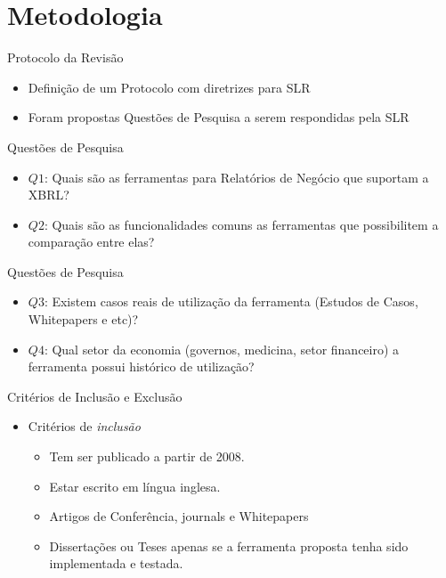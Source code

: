 \documentclass[t,14pt,mathserif]{beamer}
\begin{document}
\section{Metodologia}
\begin{frame}{Protocolo da Revisão}
    \begin{itemize}
      \item Definição de um Protocolo com diretrizes para SLR
        \cite{kitchenham2009systematic}
      \item Foram propostas Questões de Pesquisa a serem respondidas pela SLR
  \end{itemize}
\end{frame}
\begin{frame}{Questões de Pesquisa}
    \begin{itemize}
     \item \textbf{$Q1$}: Quais são as ferramentas para Relatórios de Negócio que
    suportam a XBRL?
  \item \textbf{$Q2$}: Quais são as funcionalidades comuns as ferramentas
    que possibilitem a comparação entre elas?
    \end{itemize}
\end{frame}
\begin{frame}{Questões de Pesquisa}
    \begin{itemize}
        \item \textbf{$Q3$}: Existem casos reais de utilização da ferramenta
    (Estudos de Casos, Whitepapers e etc)?
      \item \textbf{$Q4$}: Qual setor da economia (governos, medicina, setor financeiro) a ferramenta possui histórico de utilização?
    \end{itemize}
\end{frame}
\begin{frame}{Critérios de Inclusão e Exclusão}
    \begin{itemize}
      \item Critérios de \textit{inclusão}
              \begin{itemize}

                   \item Tem ser publicado a partir de 2008.
                   \item Estar escrito em língua inglesa.
                   \item Artigos de Conferência, journals e Whitepapers
                   \item Dissertações ou Teses apenas se a ferramenta proposta tenha sido
  implementada e testada.
              \end{itemize}
    \end{itemize}
\end{frame}
\end{document}
